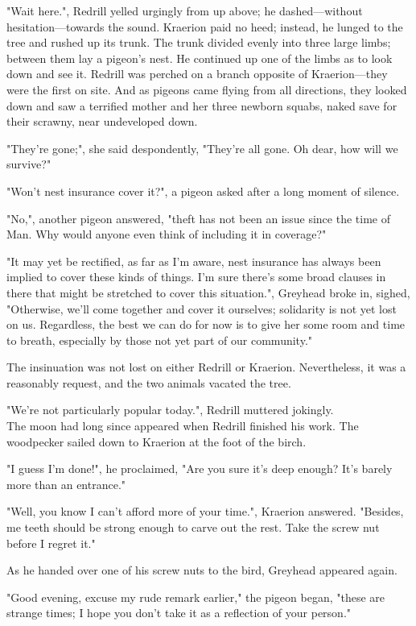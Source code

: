 "Wait here.", Redrill yelled urgingly from up above; he dashed---without hesitation---towards the sound. Kraerion paid no heed; instead, he lunged to the tree and rushed up its trunk. The trunk divided evenly into three large limbs; between them lay a pigeon's nest. He continued up one of the limbs as to look down and see it. Redrill was perched on a branch opposite of Kraerion---they were the first on site. And as pigeons came flying from all directions, they looked down and saw a terrified mother and her three newborn squabs, naked save for their scrawny, near undeveloped down.

"They're gone;", she said despondently, "They're all gone. Oh dear, how will we survive?"

"Won't nest insurance cover it?", a pigeon asked after a long moment of silence.

"No,", another pigeon answered, "theft has not been an issue since the time of Man. Why would anyone even think of including it in coverage?"

"It may yet be rectified, as far as I'm aware, nest insurance has always been implied to cover these kinds of things. I'm sure there's some broad clauses in there that might be stretched to cover this situation.", Greyhead broke in, sighed, "Otherwise, we'll come together and cover it ourselves; solidarity is not yet lost on us. Regardless, the best we can do for now is to give her some room and time to breath, especially by those not yet part of our community."

The insinuation was not lost on either Redrill or Kraerion. Nevertheless, it was a reasonably request, and the two animals vacated the tree.

"We're not particularly popular today.", Redrill muttered jokingly. \\

The moon had long since appeared when Redrill finished his work. The woodpecker sailed down to Kraerion at the foot of the birch.

"I guess I'm done!", he proclaimed, "Are you sure it's deep enough? It's barely more than an entrance."

"Well, you know I can't afford more of your time.", Kraerion answered. "Besides, me teeth should be strong enough to carve out the rest. Take the screw nut before I regret it."

As he handed over one of his screw nuts to the bird, Greyhead appeared again.

"Good evening, excuse my rude remark earlier," the pigeon began, "these are strange times; I hope you don't take it as a reflection of your person."


